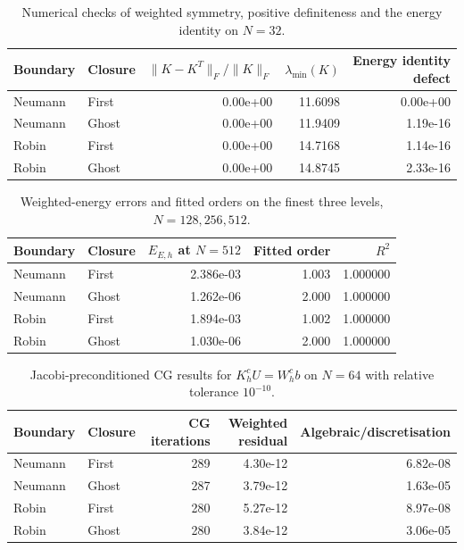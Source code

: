 \begin{table}[htbp]
\centering
\small
\begin{tabular}{llrrr}
\hline
Boundary & Closure & $\|K-K^T\|_F/\|K\|_F$ & $\lambda_{\min}(K)$ & Energy identity defect \\
\hline
Neumann & First & 0.00e+00 & 11.6098 & 0.00e+00 \\
Neumann & Ghost & 0.00e+00 & 11.9409 & 1.19e-16 \\
Robin & First & 0.00e+00 & 14.7168 & 1.14e-16 \\
Robin & Ghost & 0.00e+00 & 14.8745 & 2.33e-16 \\
\hline
\end{tabular}
\caption{Numerical checks of weighted symmetry, positive definiteness and the energy identity on $N=32$.}
\label{tab:weighted-diagnostics}
\end{table}

\begin{table}[htbp]
\centering
\small
\begin{tabular}{llrrr}
\hline
Boundary & Closure & $E_{E,h}$ at $N=512$ & Fitted order & $R^2$ \\
\hline
Neumann & First & 2.386e-03 & 1.003 & 1.000000 \\
Neumann & Ghost & 1.262e-06 & 2.000 & 1.000000 \\
Robin & First & 1.894e-03 & 1.002 & 1.000000 \\
Robin & Ghost & 1.030e-06 & 2.000 & 1.000000 \\
\hline
\end{tabular}
\caption{Weighted-energy errors and fitted orders on the finest three levels, $N=128,256,512$.}
\label{tab:energy-convergence}
\end{table}

\begin{table}[htbp]
\centering
\small
\begin{tabular}{llrrr}
\hline
Boundary & Closure & CG iterations & Weighted residual & Algebraic/discretisation \\
\hline
Neumann & First & 289 & 4.30e-12 & 6.82e-08 \\
Neumann & Ghost & 287 & 3.79e-12 & 1.63e-05 \\
Robin & First & 280 & 5.27e-12 & 8.97e-08 \\
Robin & Ghost & 280 & 3.84e-12 & 3.06e-05 \\
\hline
\end{tabular}
\caption{Jacobi-preconditioned CG results for $K_h^cU=W_h^cb$ on $N=64$ with relative tolerance $10^{-10}$.}
\label{tab:weighted-cg}
\end{table}
